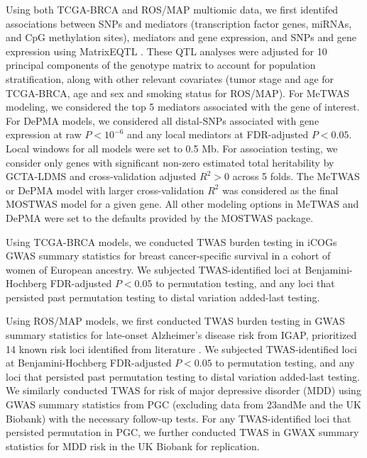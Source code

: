 Using both TCGA-BRCA and
ROS/MAP multiomic
data, we first identifed
associations between
SNPs and mediators (transcription
factor genes, miRNAs, and
CpG methylation sites),
mediators and gene expression,
and SNPs and gene expression
using MatrixEQTL
\cite{Shabalin2012a}.
These QTL analyses were
adjusted for 10 principal
components of the genotype
matrix to account for 
population stratification,
along with other relevant
covariates (tumor stage and age
for TCGA-BRCA, age and sex and smoking status for ROS/MAP).
For MeTWAS modeling, we considered
the top 5 mediators associated
with the gene of interest.
For DePMA models, we considered
all distal-SNPs
associated with gene expression
at raw $P < 10^{-6}$
and any local mediators at
FDR-adjusted $P < 0.05$.
Local windows for all models
were set to 0.5 Mb. For association
testing, we consider
only genes with significant 
non-zero
estimated total
heritability by
GCTA-LDMS \cite{Yang2015}
and cross-validation
adjusted $R^2 > 0$
across 5 folds.
The MeTWAS or DePMA
model with larger cross-validation
$R^2$ was considered
as the final MOSTWAS model
for a given gene. All
other modeling options
in MeTWAS and DePMA
were set to the defaults
provided by the MOSTWAS package.

Using TCGA-BRCA models,
we conducted TWAS burden testing
\cite{Pasaniuc2014FastEnrichment,Gusev2016} in iCOGs
GWAS summary statistics
for breast cancer-specific
survival in a cohort
of women of European ancestry.
We subjected TWAS-identified loci
at Benjamini-Hochberg \cite{Benjamini1995} 
FDR-adjusted $P < 0.05$
to permutation testing,
and any loci that persisted
past permutation testing to
distal variation
added-last testing.

Using ROS/MAP models,
we first conducted 
TWAS burden testing
in GWAS summary statistics
for late-onset
Alzheimer's disease risk
from IGAP, prioritized
14 known risk loci identified
from literature 
\cite{Lambert2013Meta-analysisDisease,Reitz2014GeneticDisease,Sims2017RareDisease,Yuan2017TheDisease}.
We subjected TWAS-identified loci
at Benjamini-Hochberg \cite{Benjamini1995} 
FDR-adjusted $P < 0.05$
to permutation testing,
and any loci that persisted
past permutation testing to
distal variation
added-last testing.
We similarly conducted TWAS
for risk of major
depressive disorder (MDD)
using GWAS summary statistics
from PGC (excluding data
from 23andMe and the UK Biobank)
with the necessary follow-up
tests. For any TWAS-identified loci
that persisted
permutation in PGC,
we further conducted TWAS
in GWAX summary statistics 
for MDD risk in
the UK Biobank
\cite{Liu2017Case-controlDisease}
for replication.
